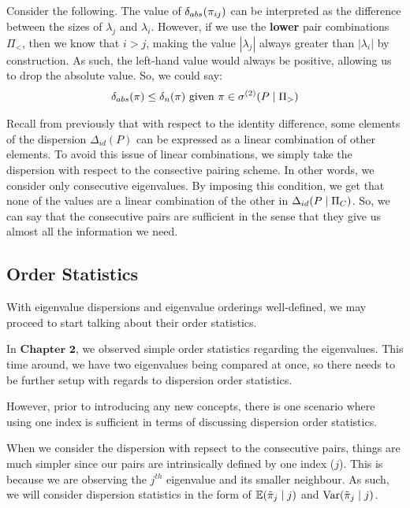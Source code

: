 Consider the following. The value of $\delta_{abs}(\pi_{ij})$ can be interpreted as the difference between the sizes of $\lambda_j$ and $\lambda_i$.
However, if we use the \textbf{lower} pair combinations $\Pi_<$, then we know that $i > j$, making the value $|\lambda_j|$ always greater than $|\lambda_i|$ by construction.
As such, the left-hand value would always be positive, allowing us to drop the absolute value. So, we could say:
\begin{align*}
\delta_{abs}(\pi) \leq \delta_{n}(\pi) \text{ given } \pi \in {\sigma^{(2)}}(P \mid \Pi_>)
\end{align*}
\medskip

 Recall from previously that with respect to the identity difference, some elements of the dispersion $\Delta_{id}(P)$
can be expressed as a linear combination of other elements. To avoid this issue of linear combinations, we simply take the dispersion with respect to the consective pairing scheme. In other words,
we consider only consecutive eigenvalues.
By imposing this condition, we get that none of the values are a linear combination of the other in $\Delta_{id}(P \mid \Pi_C)$. So, we can say that the consecutive pairs are sufficient in the sense that
they give us almost all the information we need.

\subsection{Order Statistics}
With eigenvalue dispersions and eigenvalue orderings well-defined, we may proceed to start talking about their order statistics.

In $\textbf{Chapter 2}$, we observed simple order statistics regarding the eigenvalues.
This time around, we have two eigenvalues being compared at once, so there needs to be further setup with regards to dispersion order statistics.

However, prior to introducing any new concepts, there is one scenario where using one index is sufficient in terms of discussing dispersion order statistics.

\begin{remark}
When we consider the dispersion with repsect to the consecutive pairs, things are much simpler since our pairs are intrinsically defined by one index ($j$).
This is because we are observing the $j^{th}$ eigenvalue and its smaller neighbour. As such, we will consider dispersion statistics in the form of $\mathbb{E}({\tilde{\pi}}_j \mid j)$ and $\text{Var}({\tilde{\pi}}_j \mid j)$.
\end{remark}

